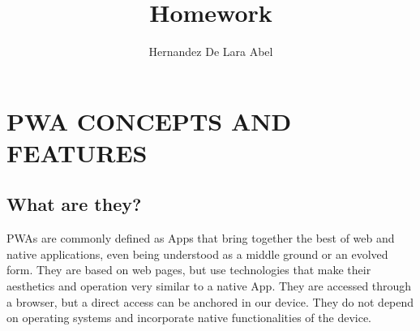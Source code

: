 \documentclass{article}
\title{Homework}
\author{Hernandez De Lara Abel}
\begin{document}
\maketitle

\section{PWA CONCEPTS AND FEATURES}
\subsection{What are they?}
PWAs are commonly defined as Apps that bring together the best of web and native applications, even being understood as a middle ground or an evolved form.
They are based on web pages, but use technologies that make their aesthetics and operation very similar to a native App. They are accessed through a browser, but a direct access can be anchored in our device. They do not depend on operating systems and incorporate native functionalities of the device.
\end{document}
